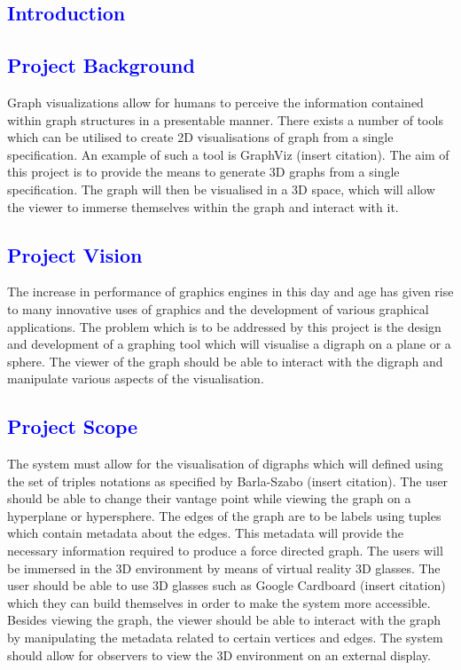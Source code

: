 \documentclass[12pt]{article}
\begin{document}
\newpage
{}
\thispagestyle{empty}
\tableofcontents
\clearpage

\textcolor{blue}{\section{Introduction}}
\textcolor{blue}{\subsection{Project Background}}
\begin{flushleft}
Graph visualizations allow for humans to perceive the information contained within graph structures in a presentable manner. There exists a number of tools which can be utilised to create 2D visualisations of graph from a single specification. An example of such a tool is GraphViz (insert citation). The aim of this project is to provide the means to generate 3D graphs from a single specification. The graph will then be visualised in a 3D space, which will allow the viewer to immerse themselves within the graph and interact with it.
\end{flushleft}

\textcolor{blue}{\subsection{Project Vision}}
\begin{flushleft}
The increase in performance of graphics engines in this day and age has given rise to many innovative uses of graphics and the development of various graphical applications. The problem which is to be addressed by this project is the design and development of a graphing tool which will visualise a digraph on a plane or a sphere. The viewer of the graph should be able to interact with the digraph and manipulate various aspects of the visualisation.
\end{flushleft}

\textcolor{blue}{\subsection{Project Scope}}
\begin{flushleft}
The system must allow for the visualisation of digraphs which will defined using the set of triples notations as specified by Barla-Szabo (insert citation). The user should be able to change their vantage point while viewing the graph on a hyperplane or hypersphere. The edges of the graph are to be labels using tuples which contain metadata about the edges. This metadata will provide the necessary information required to produce a force directed graph. The users will be immersed in the 3D environment by means of virtual reality 3D glasses. The user should be able to use 3D glasses such as Google Cardboard (insert citation) which they can build themselves in order to make the system more accessible. Besides viewing the graph, the viewer should be able to interact with the graph by manipulating the metadata related to certain vertices and edges. The system should allow for observers to view the 3D environment on an external display.
\end{flushleft}
\end{document}
